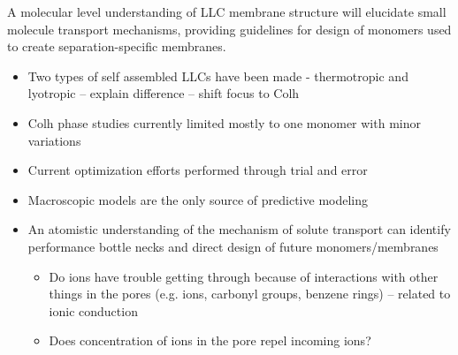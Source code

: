 \documentclass{article}
\begin{document}
        A molecular level understanding of LLC membrane structure will elucidate small molecule transport mechanisms, providing guidelines for design of monomers used to create separation-specific membranes.
        \begin{itemize}
                \item Two types of self assembled LLCs have been made - thermotropic and lyotropic -- explain difference -- shift focus to Colh
                \item Colh phase studies currently limited mostly to one monomer with minor variations
                \item Current optimization efforts performed through trial and error
                \item Macroscopic models are the only source of predictive modeling
                \item An atomistic understanding of the mechanism of solute transport can identify
                performance bottle necks and direct design of future monomers/membranes
                \begin{itemize}
                        \item Do ions have trouble getting through because of interactions with other things in the pores (e.g. ions, carbonyl groups, benzene rings) -- related to ionic conduction
                        \item Does concentration of ions in the pore repel incoming ions?
                \end{itemize}
        \end{itemize}
\end{document}
